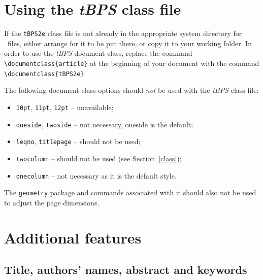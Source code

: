 \documentclass{tBPS2e}
\theoremstyle{plain}
\theoremstyle{definition}
\theoremstyle{remark}
\begin{document}
\section{Using the \textit{tBPS} class file}

If the \texttt{tBPS2e} class file is not already in the appropriate system directory for \LaTeXe\ files, either
arrange for it to be put there, or copy it to your working folder. In order to use the \textit{tBPS} document class, replace the command
\verb"\documentclass{article}" at the beginning of your document with the command \verb"\documentclass{tBPS2e}".

The following document-class options should \emph{not} be used with the \textit{tBPS} class file:
\begin{itemize}
  \item \texttt{10pt}, \texttt{11pt}, \texttt{12pt} -- unavailable;
  \item \texttt{oneside}, \texttt{twoside} -- not necessary, oneside is the default;
  \item \texttt{leqno}, \texttt{titlepage} -- should not be used;
  \item \texttt{twocolumn} -- should not be used (see Section~\ref{class});
  \item \texttt{onecolumn} -- not necessary as it is the default style.
\end{itemize}
The \texttt{geometry} package and commands associated with it should also not be used to adjust the page dimensions.


\section{Additional features}

\subsection{Title, authors' names, abstract and keywords}
\end{document}
